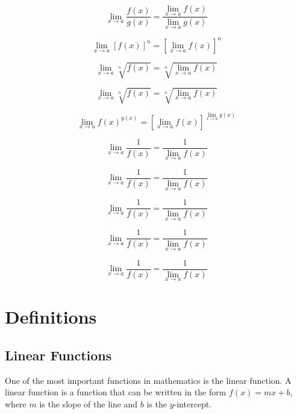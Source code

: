 \documentclass[12pt]{book}
\begin{document}
\begin{equation}
    \lim_{x \to a} \frac{f(x)}{g(x)} = \frac{\lim_{x \to a} f(x)}{\lim_{x \to a} g(x)}
\end{equation}

\begin{equation}
    \lim_{x \to a} [f(x)]^n = [\lim_{x \to a} f(x)]^n
\end{equation}

\begin{equation}
    \lim_{x \to a} \sqrt[n]{f(x)} = \sqrt[n]{\lim_{x \to a} f(x)}
\end{equation}

\begin{equation}
    \lim_{x \to a} \sqrt[n]{f(x)} = \sqrt[n]{\lim_{x \to a} f(x)}
\end{equation}

\begin{equation}
    \lim_{x \to a} f(x)^{g(x)} = \left[\lim_{x \to a} f(x)\right]^{\lim_{x \to a} g(x)}
\end{equation}

\begin{equation}
    \lim_{x \to a} \frac{1}{f(x)} = \frac{1}{\lim_{x \to a} f(x)}
\end{equation}

\begin{equation}
    \lim_{x \to a} \frac{1}{f(x)} = \frac{1}{\lim_{x \to a} f(x)}
\end{equation}

\begin{equation}
    \lim_{x \to a} \frac{1}{f(x)} = \frac{1}{\lim_{x \to a} f(x)}
\end{equation}

\begin{equation}
    \lim_{x \to a} \frac{1}{f(x)} = \frac{1}{\lim_{x \to a} f(x)}
\end{equation}

\begin{equation}
    \lim_{x \to a} \frac{1}{f(x)} = \frac{1}{\lim_{x \to a} f(x)}
\end{equation}

\chapter{Definitions}
\section{Linear Functions}
One of the most important functions in mathematics is the linear function. A linear function is a function that can be written in the form $f(x) = mx + b$, where $m$ is the slope of the line and $b$ is the $y$-intercept.
\end{document}
